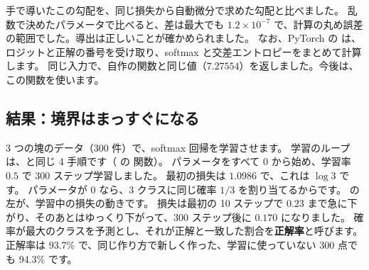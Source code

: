 手で導いたこの勾配を、同じ損失から自動微分で求めた勾配と比べました。
乱数で決めたパラメータで比べると、差は最大でも $1.2\times10^{-7}$ で、計算の丸め誤差の範囲でした。導出は正しいことが確かめられました。
なお、PyTorch の  は、ロジットと正解の番号を受け取り、softmax と交差エントロピーをまとめて計算します。
同じ入力で、自作の関数と同じ値（$7.27554$）を返しました。今後は、この関数を使います。

\subsection*{結果：境界はまっすぐになる}

3 つの塊のデータ（300 件）で、softmax 回帰を学習させます。
学習のループは、と同じ 4 手順です（ の  関数）。
パラメータをすべて 0 から始め、学習率 $0.5$ で 300 ステップ学習しました。
最初の損失は $1.0986$ で、これは $\log 3$ です。
パラメータが 0 なら、3 クラスに同じ確率 $1/3$ を割り当てるからです。
の左が、学習中の損失の動きです。
損失は最初の 10 ステップで $0.23$ まで急に下がり、そのあとはゆっくり下がって、300 ステップ後に $0.170$ になりました。
確率が最大のクラスを予測とし、それが正解と一致した割合を\textbf{正解率}と呼びます。
正解率は 93.7\% で、同じ作り方で新しく作った、学習に使っていない 300 点でも 94.3\% です。

